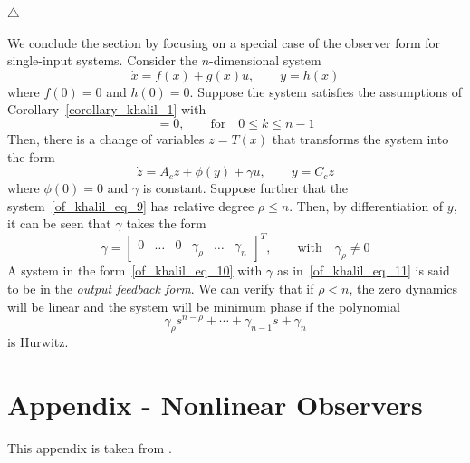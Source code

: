 \documentclass[12pt,a4paper,oneside]{book}
\begin{document}
\begin{onehalfspace}
\begin{example}
			\hfill$\triangle$
\end{example}
We conclude the section by focusing on a special case of the observer form for single-input systems. Consider the $n$-dimensional system
\begin{equation}\label{of_khalil_eq_9}
	\dot{x}=f(x)+g(x)u,\qquad y=h(x)
\end{equation}
where $f(0)=0$ and $h(0)=0$. Suppose the system satisfies the assumptions of Corollary~\ref{corollary_khalil_1} with
\begin{equation}
	[g,\,ad_f^k\tau]=0,\qquad\text{for}\quad 0\le k \le n-1
\end{equation}
Then, there is a change of variables $z=T(x)$ that transforms the system into the form
\begin{equation}\label{of_khalil_eq_10}
	\dot{z}=A_cz+\phi(y)+\gamma u,\qquad y=C_cz
\end{equation}
where $\phi(0)=0$ and $\gamma$ is constant. Suppose further that the system~\eqref{of_khalil_eq_9} has relative degree $\rho\le n$. Then, by differentiation of $y$, it can be seen that $\gamma$ takes the form
\begin{equation}\label{of_khalil_eq_11}
	\gamma = \begin{bmatrix} 0&\dots&0&\gamma_{\rho}&\dots&\gamma_n	\end{bmatrix}^T,\qquad\text{with}\quad \gamma_{\rho}\ne0
\end{equation}
A system in the form~\eqref{of_khalil_eq_10} with $\gamma$ as in~\eqref{of_khalil_eq_11} is said to be in the \textit{output feedback form}. We can verify that if $\rho<n$, the zero dynamics will be linear and the system will be minimum phase if the polynomial 
\begin{equation}
	\gamma_{\rho}s^{n-\rho}+\cdots+\gamma_{n-1}s+\gamma_n
\end{equation}
is Hurwitz.




























\chapter{Appendix - Nonlinear Observers}	
This appendix is taken from \cite{khalil_2}. 


\end{onehalfspace}
\end{document}
